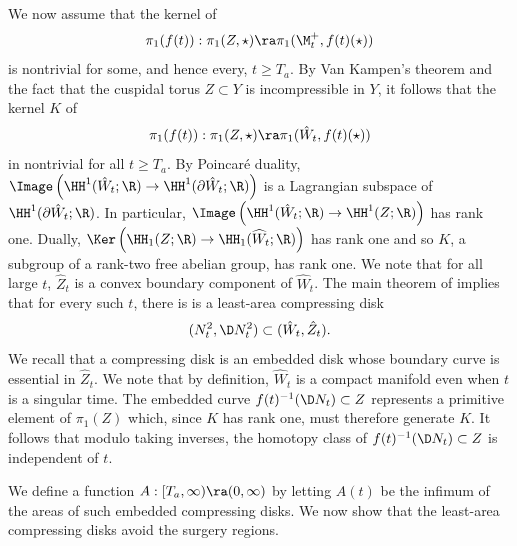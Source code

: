 \bigskip
We now assume that the kernel of
\begin{equation}
\pi_1(f(t)):\pi_1(Z,\star)\ra \pi_1(\M_t^+,f(t)(\star))
\end{equation}
is nontrivial for some, and hence every, $t\geq T_a$.  By Van Kampen's
theorem and the fact that the cuspidal torus
$Z\subset Y$ is incompressible in $Y$, it follows that the kernel $K$
of
\begin{equation}
\pi_1(f(t)):\pi_1(Z,\star)\ra \pi_1(\hat W_t,f(t)(\star))
\end{equation}
in nontrivial for all $t\geq T_a$.   By Poincar\'e duality,
$\Image \left( \HH^1(\hat{W}_t; \R) \rightarrow \HH^1(\partial \hat{W}_t; \R) \right)$
is a Lagrangian subspace of $\HH^1(\partial \hat{W}_t; \R)$. In particular,
$\Image \left( \HH^1(\hat{W}_t; \R) \rightarrow \HH^1(Z; \R) \right)$
has
rank one. Dually,
$\Ker \left( \HH_1(Z; \R) \rightarrow \HH_1(\widehat{W}_t; \R) \right)$
has rank one and so $K$,
a subgroup of a rank-two free abelian group,
has rank one. We note that for all large $t$,
$\hat{Z}_t$ is a convex
boundary component of $\hat W_t$.
The main theorem of \cite{meeksyau}  implies that for
every such $t$, there is
is a least-area compressing disk
\begin{equation}
(N^2_t,\D N^2_t)\subset (\hat W_t,\hat Z_t).
\end{equation}
We  recall that a compressing disk is an embedded disk whose boundary curve is essential
in $\hat Z_t$. We note that by definition, $\hat W_t$ is a compact manifold
even when $t$ is a singular time.
The embedded curve $f(t)^{-1}(\D N_t)\subset Z$
represents a primitive element of $\pi_1(Z)$ which,
since $K$ has  rank one, must therefore generate $K$.
It follows that
modulo taking inverses, the homotopy class of $f(t)^{-1}(\D N_t)\subset Z$ is independent of $t$.

We define a function $A:[T_a,\infty)\ra (0,\infty)$
by letting $A(t)$ be the infimum of the areas of such embedded compressing disks.
We now show that the least-area compressing disks avoid the surgery regions.


